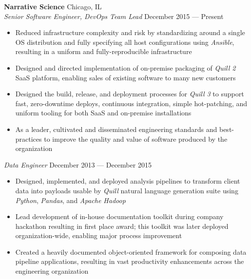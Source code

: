 \documentclass[line,margin]{res}
\begin{document}
\begin{resume}
    \textbf{Narrative Science} \hfill Chicago, IL \\
    \textit{Senior Software Engineer, DevOps Team Lead}
    \hfill December 2015 --- Present
        \begin{itemize}  \itemsep -2pt
            \item Reduced infrastructure complexity and risk by standardizing
                around a single OS distribution and fully specifying all host
                configurations using \textit{Ansible}, resulting in a uniform
                and fully-reproducible infrastructure
            \item Designed and directed implementation of on-premise packaging
                of \textit{Quill 2} SaaS platform, enabling sales of existing
                software to many new customers
            \item Designed the build, release, and deployment processes for
                \textit{Quill 3} to support fast, zero-downtime deploys,
                continuous integration, simple hot-patching, and uniform
                tooling for both SaaS and on-premise installations
            \item As a leader, cultivated and disseminated engineering
                standards and best-practices to improve the quality and value
                of  software produced by the organization
        \end{itemize}
     \textit{Data Engineer} \hfill December 2013 --- December 2015
        \begin{itemize} \itemsep -2pt
            \item Designed, implemented, and deployed     analysis pipelines to
                transform client data into payloads usable by \textit{Quill}
                natural language generation suite using \textit{Python},
                \textit{Pandas}, and \textit{Apache Hadoop}
            \item Lead development of in-house documentation toolkit during
                company hackathon resulting in first place award; this toolkit
                was later deployed organization-wide, enabling major process
                improvement
            \item Created a heavily documented object-oriented framework for
                composing data pipeline applications, resulting in vast
                productivity enhancements across the engineering organization
        \end{itemize}


\end{resume}
\end{document}
